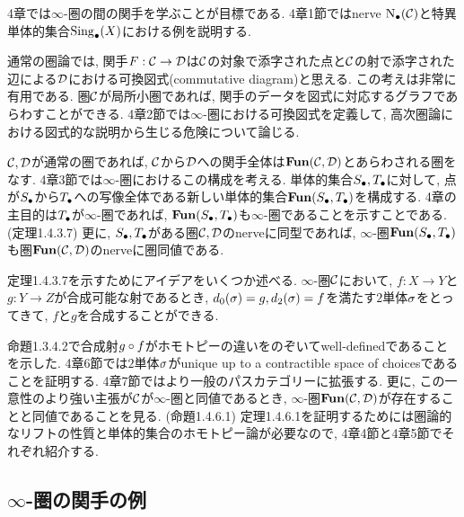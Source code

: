 \documentclass[uplatex, a4paper, 14Q, dvipdfmx]{jsreport}
\begin{document}
4章では$\infty$-圏の間の関手を学ぶことが目標である. 
4章1節ではnerve $\N(\calC)$と特異単体的集合$\Sing_\bullet(X)$における例を説明する. 

通常の圏論では, 関手$F: \calC \to \calD$は$\calC$の対象で添字された点と$\calC$の射で添字された辺による$\calD$における可換図式(commutative diagram)と思える. 
この考えは非常に有用である. 
圏$\calC$が局所小圏であれば, 関手のデータを図式に対応するグラフであらわすことができる. 
4章2節では$\infty$-圏における可換図式を定義して, 高次圏論における図式的な説明から生じる危険について論じる. 

$\calC,\calD$が通常の圏であれば, $\calC$から$\calD$への関手全体は$\fun(\calC,\calD)$とあらわされる圏をなす. 
4章3節では$\infty$-圏におけるこの構成を考える. 
単体的集合$\S,\T$に対して, 点が$\S$から$\T$への写像全体である新しい単体的集合$\fun(\S,\T)$を構成する. 
4章の主目的は$\T$が$\infty$-圏であれば, $\fun(\S,\T)$も$\infty$-圏であることを示すことである. (定理1.4.3.7)
更に, $\S,\T$がある圏$\calC,\calD$のnerveに同型であれば, $\infty$-圏$\fun(\S,\T)$も圏$\fun(\calC,\calD)$のnerveに圏同値である. 

定理1.4.3.7を示すためにアイデアをいくつか述べる. 
$\infty$-圏$\calC$において, $f: X \to Y$と$g: Y \to Z$が合成可能な射であるとき, $d_0(\si)=g, d_2(\si)=f$を満たす$2$単体$\si$をとってきて, $f$と$g$を合成することができる. 
\begin{center}
\end{center}

命題1.3.4.2で合成射$g \ci f$がホモトピーの違いをのぞいてwell-definedであることを示した. 
4章6節では$2$単体$\si$がunique up to a contractible space of choicesであることを証明する.
4章7節ではより一般のパスカテゴリーに拡張する.
更に, この一意性のより強い主張が$\calC$が$\infty$-圏と同値であるとき, $\infty$-圏$\fun(\calC,\calD)$が存在することと同値であることを見る.  (命題1.4.6.1)
定理1.4.6.1を証明するためには圏論的なリフトの性質と単体的集合のホモトピー論が必要なので, 4章4節と4章5節でそれぞれ紹介する. 

\subsection{\texorpdfstring{$\infty$}{infty}-圏の関手の例}
\end{document}
